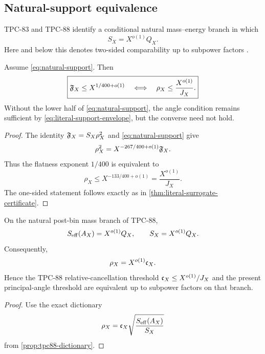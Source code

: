 \subsection{Natural-support equivalence}

TPC-83 and TPC-88 identify a conditional natural mass--energy
branch in which
\begin{equation}
 S_X=X^{o(1)}Q_X.
\label{eq:natural-support}
\end{equation}
Here and below this denotes two-sided comparability up to subpower
factors \citep{WangTPC83,WangTPC88}.

\begin{proposition}
\label{prop:natural-angle-equivalence}
Assume \eqref{eq:natural-support}.  Then
\begin{equation}
 \boxed{
 \mathfrak F_X\le X^{1/400+o(1)}
 \quad\Longleftrightarrow\quad
 \rho_X\le\frac{X^{o(1)}}{J_X}.}
\label{eq:natural-angle-equivalence}
\end{equation}
Without the lower half of \eqref{eq:natural-support}, the angle
condition remains sufficient by
\eqref{eq:literal-support-envelope}, but the converse need not hold.
\end{proposition}

\begin{proof}
The identity \(\mathfrak F_X=S_X\rho_X^2\) and
\eqref{eq:natural-support} give
\[
 \rho_X^2
 =
 X^{-267/400+o(1)}\mathfrak F_X.
\]
Thus the flatness exponent \(1/400\) is equivalent to
\[
 \rho_X
 \le
 X^{-133/400+o(1)}
 =
 \frac{X^{o(1)}}{J_X}.
\]
The one-sided statement follows exactly as in
\cref{thm:literal-surrogate-certificate}.
\end{proof}

\begin{proposition}
\label{prop:canc-rho-thresholds}
On the natural post-bin mass branch of TPC-88,
\[
 S_{\mathrm{eff}}(A_X)=X^{o(1)}Q_X,\qquad
 S_X=X^{o(1)}Q_X.
\]
Consequently,
\begin{equation}
 \rho_X=X^{o(1)}\mathfrak c_X.
\label{eq:canc-rho-natural}
\end{equation}
Hence the TPC-88 relative-cancellation threshold
\(\mathfrak c_X\le X^{o(1)}/J_X\) and the present principal-angle
threshold are equivalent up to subpower factors on that branch.
\end{proposition}

\begin{proof}
Use the exact dictionary
\[
 \rho_X=\mathfrak c_X\sqrt{\frac{S_{\mathrm{eff}}(A_X)}{S_X}}
\]
from \cref{prop:tpc88-dictionary}.
\end{proof}

